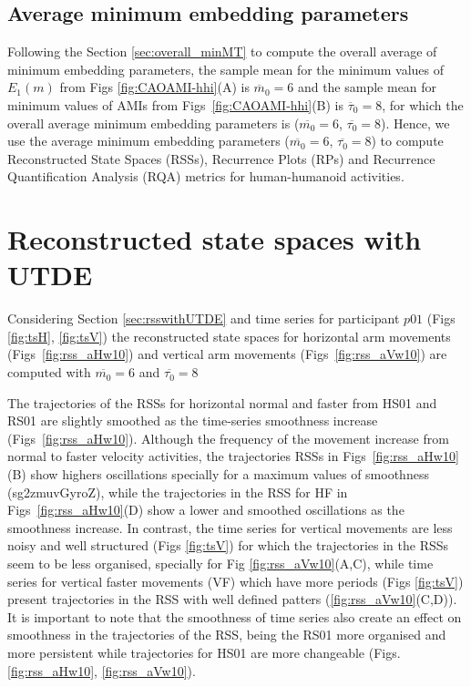 \newpage
\subsection{Average minimum embedding parameters}
Following the Section \ref{sec:overall_minMT} to compute the overall average 
of minimum embedding parameters, the sample mean for the 
minimum values of $E_{1}(m)$ from Figs \ref{fig:CAOAMI-hhi}(A) 
is $\overline{m}_0=6$ and the sample 
mean for minimum values of AMIs from Figs~\ref{fig:CAOAMI-hhi}(B)
is $\overline{\tau}_0=8$, for which the overall average minimum embedding 
parameters is ($\overline{m_0}=6$, $\overline{\tau_0}=8$).
Hence, we use the average minimum embedding parameters 
($\overline{m_0}=6$, $\overline{\tau_0}=8$) to compute 
Reconstructed State Spaces (RSSs), Recurrence Plots (RPs) and
Recurrence Quantification Analysis (RQA) metrics for human-humanoid activities.

\section{Reconstructed state spaces with UTDE}
Considering Section \ref{sec:rsswithUTDE} and time series for participant $p01$ 
(Figs \ref{fig:tsH}, \ref{fig:tsV}) the reconstructed state spaces
for horizontal arm movements (Figs~\ref{fig:rss_aHw10}) and
 vertical arm movements  (Figs~\ref{fig:rss_aVw10}) 
are computed with $\overline{m_0}=6$ and $\overline{\tau_0}=8$ 

The trajectories of the RSSs for horizontal normal and faster from 
HS01 and RS01 are slightly smoothed as the time-series 
smoothness increase (Figs~\ref{fig:rss_aHw10}). 
Although the frequency of the movement increase from normal to faster velocity
activities, the trajectories RSSs in Figs~\ref{fig:rss_aHw10}(B)
show highers oscillations specially for a maximum values of smoothness
(sg2zmuvGyroZ), while the trajectories in the RSS for HF in 
Figs~\ref{fig:rss_aHw10}(D) show a lower and smoothed oscillations 
as the smoothness increase.
In contrast, the time series for vertical movements are less noisy and 
well structured (Figs \ref{fig:tsV}) for which the trajectories in the RSSs 
seem to be less organised, specially for Fig \ref{fig:rss_aVw10}(A,C), 
while time series for vertical faster movements (VF) which have more 
periods (Figs \ref{fig:tsV}) present trajectories in the RSS with 
well defined patters (\ref{fig:rss_aVw10}(C,D)).
It is important to note that the smoothness of time series also create 
an effect on smoothness in the trajectories of the RSS, being the RS01 
more organised and more persistent while trajectories for HS01 are 
more changeable (Figs. \ref{fig:rss_aHw10}, \ref{fig:rss_aVw10}).

